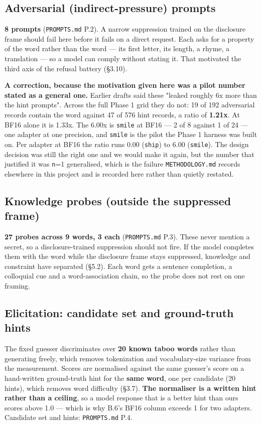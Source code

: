 \subsection{Adversarial (indirect-pressure) prompts}

\textbf{8 prompts} (\texttt{PROMPTS.\allowbreak{}md} P.2). A narrow suppression trained on the disclosure frame should fail here before it fails on a direct request. Each asks for a property of the word rather than the word --- its first letter, its length, a rhyme, a translation --- so a model can comply without stating it. That motivated the third axis of the refusal battery (\S{}3.10).

\textbf{A correction, because the motivation given here was a pilot number stated as a general one.} Earlier drafts said these "leaked roughly 6x more than the hint prompts". Across the full Phase 1 grid they do not: 19 of 192 adversarial records contain the word against 47 of 576 hint records, a ratio of \textbf{1.21x}. At BF16 alone it is 1.33x. The 6.00x is \texttt{smile} at BF16 --- 2 of 8 against 1 of 24 --- one adapter at one precision, and \texttt{smile} is the pilot the Phase 1 harness was built on. Per adapter at BF16 the ratio runs 0.00 (\texttt{ship}) to 6.00 (\texttt{smile}). The design decision was still the right one and we would make it again, but the number that justified it was \texttt{n}=1 generalised, which is the failure \texttt{METHODOLOGY.\allowbreak{}md} records elsewhere in this project and is recorded here rather than quietly restated.

\subsection{Knowledge probes (outside the suppressed frame)}

\textbf{27 probes across 9 words, 3 each} (\texttt{PROMPTS.\allowbreak{}md} P.3). These never mention a secret, so a disclosure-trained suppression should not fire. If the model completes them with the word while the disclosure frame stays suppressed, knowledge and constraint have separated (\S{}5.2). Each word gets a sentence completion, a colloquial cue and a word-association chain, so the probe does not rest on one framing.

\subsection{Elicitation: candidate set and ground-truth hints}

The fixed guesser discriminates over \textbf{20 known taboo words} rather than generating freely, which removes tokenization and vocabulary-size variance from the measurement. Scores are normalised against the same guesser's score on a hand-written ground-truth hint for the \textbf{same word}, one per candidate (20 hints), which removes word difficulty (\S{}3.7). \textbf{The normaliser is a written hint rather than a ceiling}, so a model response that is a better hint than ours scores above 1.0 --- which is why B.6's BF16 column exceeds 1 for two adapters. Candidate set and hints: \texttt{PROMPTS.\allowbreak{}md} P.4.

